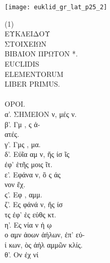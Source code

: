 \texttt{[image: euklid\_gr\_lat\_p25\_2]}
\clearpage

\begin{typeLatin}
 (1)\bold{>} \\
ΕΥΚΛΕΙΔΟΥ \\
ΣΤΟΙΧΕΙΩΝ \\
ΒΙΒΛΙΟΝ ΠΡΩΤΟΝ  *\bold{>}. \\
EUCLIDIS\\
ELEMENTORUM\\
LIBER PRIMUS.\\
\\
ΟΡΟΙ.\\
α'. ΣΗΜΕΙΟΝ ν,  μές ν. \\
β'. Γμ , ς ἀ- \\
ατές. \\
γ'. Γμς  , μα. \\
δ'. Εὐῖα αμ ν, ἥς ίσ ῖς \\
ἐφ' ἑτῆς μοις ῖτ. \\
ε'. Εφάνα  ν, ὃ ς  άς \\
νον ἔχ. \\
ϛ'. Εφ  , αμμ. \\
ζ'. Ες φάνά ν, ἥς ίσ \\
τς ἐφ' ἑς εὐθς κτ. \\
η'. Ες  νία ν ἡ  ῳ \\
ο αμν ἁοων ἀήλων,   ἐπ' εὐ- \\
ί κων, ὸς ἀήλ  αμμῶν κλίς. \\
θ'. Ον   έχ  νί \\

\end{typeLatin}
